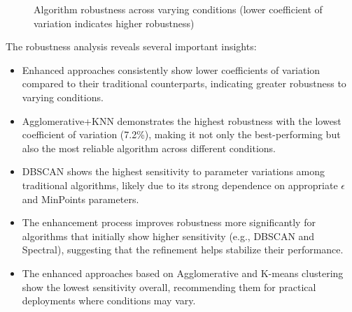 \begin{figure}[htbp]
    \centering
    \caption{Algorithm robustness across varying conditions (lower coefficient of variation indicates higher robustness)}
    \label{fig:algorithm_robustness}
\end{figure}

The robustness analysis reveals several important insights:

\begin{itemize}
    \item Enhanced approaches consistently show lower coefficients of variation compared to their traditional counterparts, indicating greater robustness to varying conditions.
    
    \item Agglomerative+KNN demonstrates the highest robustness with the lowest coefficient of variation (7.2\%), making it not only the best-performing but also the most reliable algorithm across different conditions.
    
    \item DBSCAN shows the highest sensitivity to parameter variations among traditional algorithms, likely due to its strong dependence on appropriate $\epsilon$ and MinPoints parameters.
    
    \item The enhancement process improves robustness more significantly for algorithms that initially show higher sensitivity (e.g., DBSCAN and Spectral), suggesting that the refinement helps stabilize their performance.
    
    \item The enhanced approaches based on Agglomerative and K-means clustering show the lowest sensitivity overall, recommending them for practical deployments where conditions may vary.
\end{itemize}


